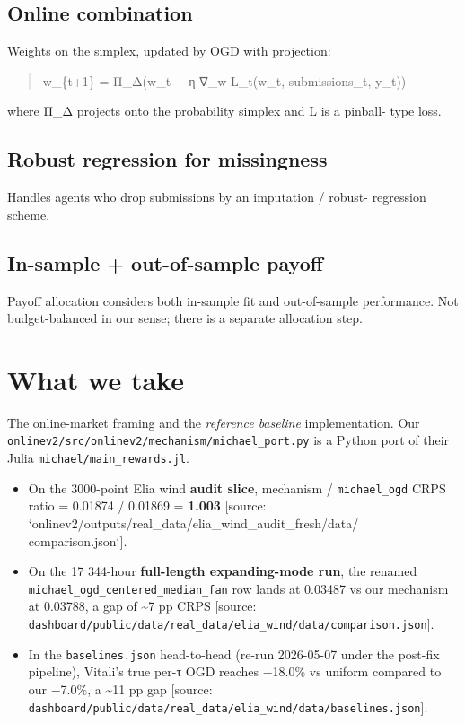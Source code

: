 \documentclass[11pt,a4paper,openany]{report}
\begin{document}
\subsection{Online combination}

Weights on the simplex, updated by OGD with projection:

\begin{quote}
w\_\{t+1\} = Π\_Δ(w\_t − η ∇\_w L\_t(w\_t, submissions\_t, y\_t))

\end{quote}
where Π\_Δ projects onto the probability simplex and L is a pinball-
type loss.

\subsection{Robust regression for missingness}

Handles agents who drop submissions by an imputation / robust-
regression scheme.

\subsection{In-sample + out-of-sample payoff}

Payoff allocation considers both in-sample fit and out-of-sample
performance. Not budget-balanced in our sense; there is a separate
allocation step.

\section{What we take}

The online-market framing and the \emph{reference baseline} implementation.
Our \texttt{onlinev2/src/onlinev2/mechanism/michael\_port.py} is a Python port
of their Julia \texttt{michael/main\_rewards.jl}.

\begin{itemize}
  \item On the 3000-point Elia wind \textbf{audit slice}, mechanism /
    \texttt{michael\_ogd} CRPS ratio = 0.01874 / 0.01869 = \textbf{1.003}
    [source: `onlinev2/outputs/real\_data/elia\_wind\_audit\_fresh/data/
    comparison.json`].
  \item On the 17 344-hour \textbf{full-length expanding-mode run}, the renamed
    \texttt{michael\_ogd\_centered\_median\_fan} row lands at 0.03487 vs our
    mechanism at 0.03788, a gap of \textasciitilde{}7 pp CRPS [source:
    \texttt{dashboard/public/data/real\_data/elia\_wind/data/comparison.json}].
  \item In the \texttt{baselines.json} head-to-head (re-run 2026-05-07 under the
    post-fix pipeline), Vitali's true per-τ OGD reaches −18.0\% vs
    uniform compared to our −7.0\%, a \textasciitilde{}11 pp gap [source:
    \texttt{dashboard/public/data/real\_data/elia\_wind/data/baselines.json}].
\end{itemize}
\end{document}
